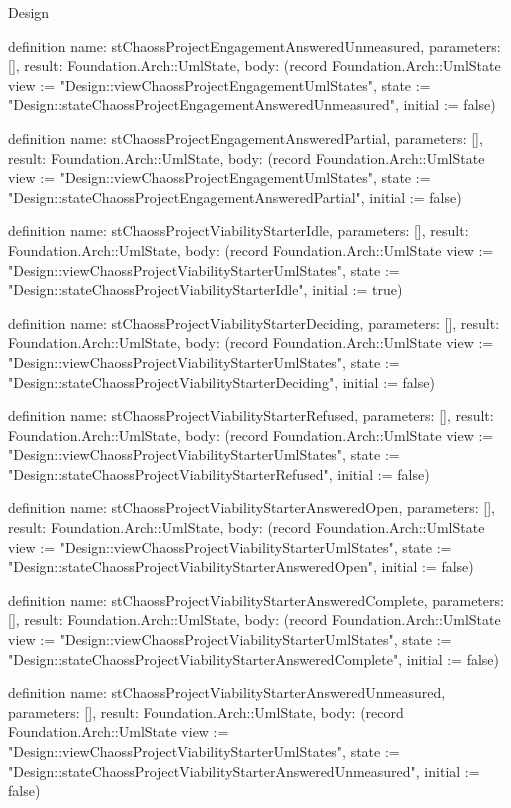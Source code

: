 \begin{lexlean}{Design}
\begin{semanticmodule}
definition{
  name: stChaossProjectEngagementAnsweredUnmeasured,
  parameters: [],
  result: Foundation.Arch::UmlState,
  body: (record Foundation.Arch::UmlState {view := "Design::viewChaossProjectEngagementUmlStates", state := "Design::stateChaossProjectEngagementAnsweredUnmeasured", initial := false})
}

definition{
  name: stChaossProjectEngagementAnsweredPartial,
  parameters: [],
  result: Foundation.Arch::UmlState,
  body: (record Foundation.Arch::UmlState {view := "Design::viewChaossProjectEngagementUmlStates", state := "Design::stateChaossProjectEngagementAnsweredPartial", initial := false})
}

definition{
  name: stChaossProjectViabilityStarterIdle,
  parameters: [],
  result: Foundation.Arch::UmlState,
  body: (record Foundation.Arch::UmlState {view := "Design::viewChaossProjectViabilityStarterUmlStates", state := "Design::stateChaossProjectViabilityStarterIdle", initial := true})
}

definition{
  name: stChaossProjectViabilityStarterDeciding,
  parameters: [],
  result: Foundation.Arch::UmlState,
  body: (record Foundation.Arch::UmlState {view := "Design::viewChaossProjectViabilityStarterUmlStates", state := "Design::stateChaossProjectViabilityStarterDeciding", initial := false})
}

definition{
  name: stChaossProjectViabilityStarterRefused,
  parameters: [],
  result: Foundation.Arch::UmlState,
  body: (record Foundation.Arch::UmlState {view := "Design::viewChaossProjectViabilityStarterUmlStates", state := "Design::stateChaossProjectViabilityStarterRefused", initial := false})
}

definition{
  name: stChaossProjectViabilityStarterAnsweredOpen,
  parameters: [],
  result: Foundation.Arch::UmlState,
  body: (record Foundation.Arch::UmlState {view := "Design::viewChaossProjectViabilityStarterUmlStates", state := "Design::stateChaossProjectViabilityStarterAnsweredOpen", initial := false})
}

definition{
  name: stChaossProjectViabilityStarterAnsweredComplete,
  parameters: [],
  result: Foundation.Arch::UmlState,
  body: (record Foundation.Arch::UmlState {view := "Design::viewChaossProjectViabilityStarterUmlStates", state := "Design::stateChaossProjectViabilityStarterAnsweredComplete", initial := false})
}

definition{
  name: stChaossProjectViabilityStarterAnsweredUnmeasured,
  parameters: [],
  result: Foundation.Arch::UmlState,
  body: (record Foundation.Arch::UmlState {view := "Design::viewChaossProjectViabilityStarterUmlStates", state := "Design::stateChaossProjectViabilityStarterAnsweredUnmeasured", initial := false})
}


\end{semanticmodule}
\end{lexlean}
